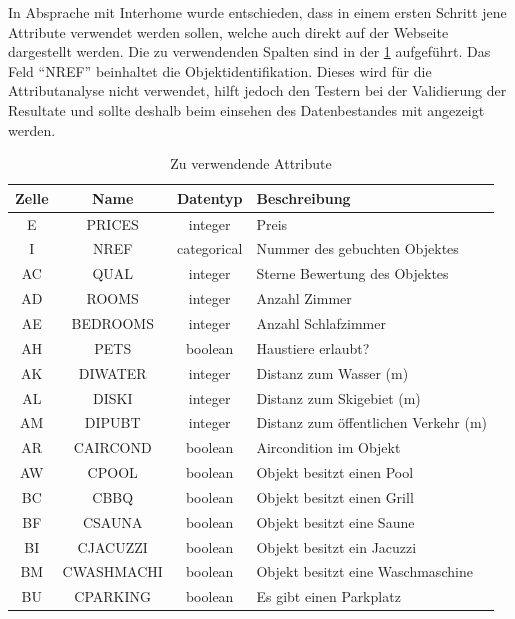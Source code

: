 In Absprache mit Interhome wurde entschieden, dass in einem ersten Schritt jene Attribute verwendet werden sollen, welche auch direkt auf der Webseite dargestellt werden. Die zu verwendenden Spalten sind in der \cref{fig:recherche:attributeinschraenkung:2} aufgeführt. Das Feld "`NREF"' beinhaltet die Objektidentifikation. Dieses wird für die Attributanalyse nicht verwendet, hilft jedoch den Testern bei der Validierung der Resultate und sollte deshalb beim einsehen des Datenbestandes mit angezeigt werden.

\begin{table}[H] 
	\caption{Zu verwendende Attribute}
	\centering
		\label{fig:recherche:attributeinschraenkung:2}
	\begin{tabular}{ | c | c | c | l | } 
		\hline 
		\rowcolor{tableheadcolor}
		\bfseries Zelle & \bfseries Name & \bfseries Datentyp & \bfseries Beschreibung \\ \hline 
		E & PRICES & integer & Preis \\ \hline 
		I & NREF & categorical & Nummer des gebuchten Objektes \\ \hline 
		AC & QUAL & integer & Sterne Bewertung des Objektes \\ \hline 
		AD & ROOMS & integer & Anzahl Zimmer \\ \hline 
		AE & BEDROOMS & integer & Anzahl Schlafzimmer \\ \hline 
		AH & PETS & boolean & Haustiere erlaubt? \\ \hline 
		AK & DIWATER & integer & Distanz zum Wasser (m) \\ \hline 
		AL & DISKI & integer & Distanz zum Skigebiet (m) \\ \hline 
		AM & DIPUBT & integer & Distanz zum öffentlichen Verkehr (m) \\ \hline 
		AR & CAIRCOND & boolean & Aircondition im Objekt\\ \hline 
		AW & CPOOL & boolean & Objekt besitzt einen Pool \\ \hline 
		BC & CBBQ & boolean & Objekt besitzt einen Grill \\ \hline 
		BF & CSAUNA & boolean & Objekt besitzt eine Saune \\ \hline 
		BI & CJACUZZI & boolean & Objekt besitzt ein Jacuzzi \\ \hline 
		BM & CWASHMACHI & boolean & Objekt besitzt eine Waschmaschine \\ \hline 
		BU & CPARKING & boolean & Es gibt einen Parkplatz \\ \hline 

\end{tabular}
\end{table}
